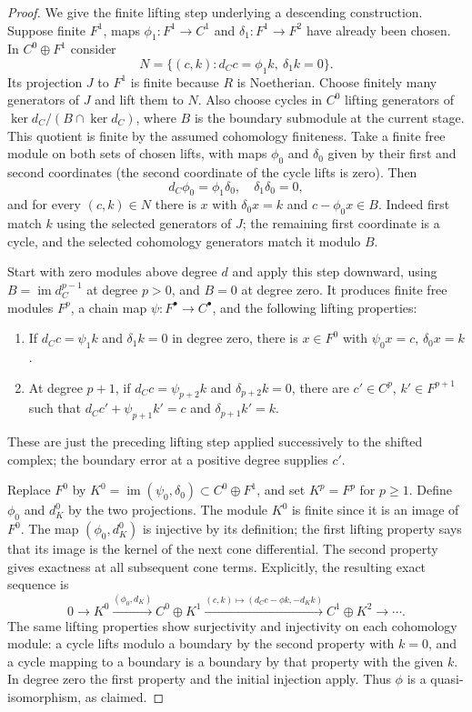 \begin{proof}
We give the finite lifting step underlying a descending construction.
Suppose finite $F^1$, maps $\phi_1:F^1\to C^1$ and
$\delta_1:F^1\to F^2$ have already been chosen.  In
$C^0\oplus F^1$ consider
\[
 N=\{(c,k):d_Cc=\phi_1k,\ \delta_1k=0\}.
\]
Its projection $J$ to $F^1$ is finite because $R$ is Noetherian.
Choose finitely many generators of $J$ and lift them to $N$.  Also
choose cycles in $C^0$ lifting generators of
$\ker d_C/(B\cap\ker d_C)$, where $B$ is the boundary submodule
at the current stage.  This quotient is finite by the assumed
cohomology finiteness.  Take a finite free module on both sets of
chosen lifts, with maps $\phi_0$ and $\delta_0$ given by their first
and second coordinates (the second coordinate of the cycle lifts is
zero).  Then
\[
 d_C\phi_0=\phi_1\delta_0,\quad
 \delta_1\delta_0=0,
\]
and for every $(c,k)\in N$ there is $x$ with
$\delta_0x=k$ and $c-\phi_0x\in B$.  Indeed first match $k$ using
the selected generators of $J$; the remaining first coordinate is a
cycle, and the selected cohomology generators match it modulo $B$.

Start with zero modules above degree $d$ and apply this step downward,
using $B=\operatorname{im}d_C^{p-1}$ at degree $p>0$, and $B=0$
at degree zero.  It produces finite free modules $F^p$, a chain map
$\psi:F^\bullet\to C^\bullet$, and the following lifting
properties:
\begin{enumerate}
 \item If $d_Cc=\psi_1k$ and $\delta_1k=0$ in degree zero,
 there is $x\in F^0$ with $\psi_0x=c$, $\delta_0x=k$.
 \item At degree $p+1$, if $d_Cc=\psi_{p+2}k$ and
 $\delta_{p+2}k=0$, there are $c'\in C^p$, $k'\in F^{p+1}$
 such that $d_Cc'+\psi_{p+1}k'=c$ and $\delta_{p+1}k'=k$.
\end{enumerate}
These are just the preceding lifting step applied successively to the
shifted complex; the boundary error at a positive degree supplies $c'$.

Replace $F^0$ by
$K^0=\operatorname{im}(\psi_0,\delta_0)\subset C^0\oplus F^1$,
and set $K^p=F^p$ for $p\ge1$.  Define $\phi_0$ and $d_K^0$
by the two projections.  The module $K^0$ is finite since it is an
image of $F^0$.  The map $(\phi_0,d_K^0)$ is injective by its
definition; the first lifting property says that its image is the
kernel of the next cone differential.  The second property gives
exactness at all subsequent cone terms.  Explicitly, the resulting
exact sequence is
\[
 0\longrightarrow K^0\xrightarrow{(\phi_0,d_K)}
 C^0\oplus K^1\xrightarrow{(c,k)\mapsto(d_Cc-\phi k,-d_Kk)}
 C^1\oplus K^2\longrightarrow\cdots . \tag{GSL.4}
\]
The same lifting properties show surjectivity and injectivity on each
cohomology module: a cycle lifts modulo a boundary by the second
property with $k=0$, and a cycle mapping to a boundary is a boundary
by that property with the given $k$.  In degree zero the first
property and the initial injection apply.  Thus $\phi$ is a
quasi-isomorphism, as claimed.
\end{proof}

